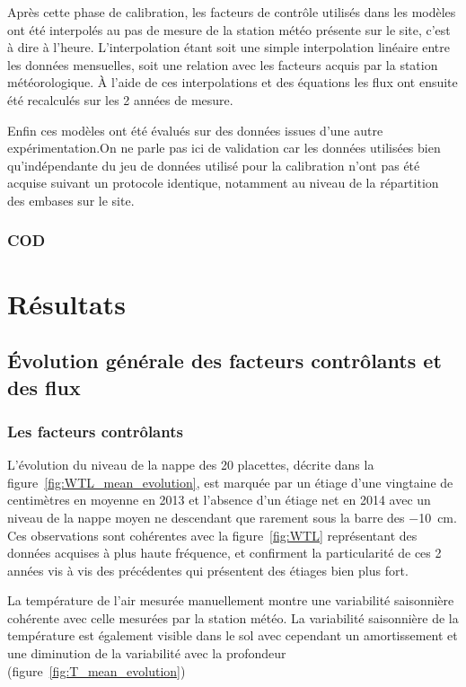 Après cette phase de calibration, les facteurs de contrôle utilisés dans les modèles ont été interpolés au pas de mesure de la station météo présente sur le site, c'est à dire à l'heure.
L'interpolation étant soit une simple interpolation linéaire entre les données mensuelles, soit une relation avec les facteurs acquis par la station météorologique.
À l'aide de ces interpolations et des équations les flux ont ensuite été recalculés sur les 2 années de mesure.

Enfin ces modèles ont été évalués sur des données issues d'une autre expérimentation.On ne parle pas ici de validation car les données utilisées bien qu'indépendante du jeu de données utilisé pour la calibration n'ont pas été acquise suivant un protocole identique, notamment au niveau de la répartition des embases sur le site.

\subsubsection{COD}

\section{Résultats}

\subsection{Évolution générale des facteurs contrôlants et des flux}

\subsubsection{Les facteurs contrôlants}

L'évolution du niveau de la nappe des 20 placettes, décrite dans la figure~\ref{fig:WTL_mean_evolution}, est marquée par un étiage d'une vingtaine de centimètres en moyenne en 2013 et l'absence d'un étiage net en 2014 avec un niveau de la nappe moyen ne descendant que rarement sous la barre des \SI{-10}{\cm}.
Ces observations sont cohérentes avec la figure~\ref{fig:WTL} représentant des données acquises à plus haute fréquence, et confirment la particularité de ces 2 années vis à vis des précédentes qui présentent des étiages bien plus fort.

La température de l'air mesurée manuellement montre une variabilité saisonnière cohérente avec celle mesurées par la station météo. 
La variabilité saisonnière de la température est également visible dans le sol avec cependant un amortissement et une diminution de la variabilité avec la profondeur (figure~\ref{fig:T_mean_evolution})

